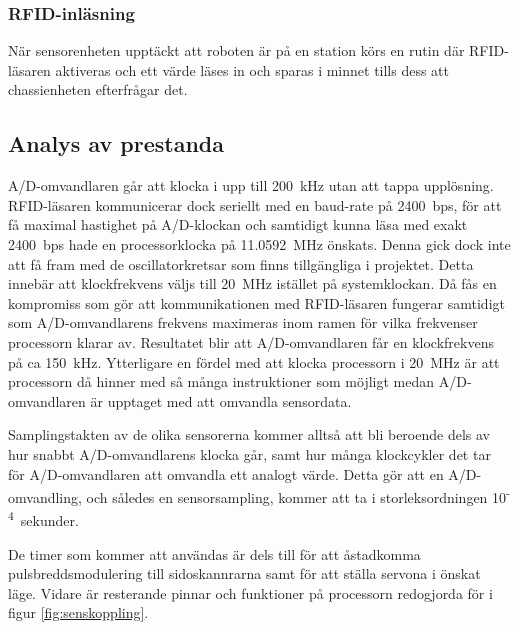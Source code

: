 \subsubsection{RFID-inläsning}

När sensorenheten upptäckt att roboten är på en station körs en rutin där RFID-läsaren aktiveras och ett värde läses in och sparas i minnet tills dess att chassienheten efterfrågar det.


\subsection{Analys av prestanda}

A/D-omvandlaren går att klocka i upp till 200~kHz utan att tappa upplösning. RFID-läsaren kommunicerar dock seriellt med en baud-rate på 2400~bps, för att få maximal hastighet på A/D-klockan och samtidigt kunna läsa med exakt 2400~bps hade en processorklocka på 11.0592~MHz önskats. Denna gick dock inte att få fram med de oscillatorkretsar som finns tillgängliga i projektet. Detta innebär att klockfrekvens väljs till  20~MHz istället på systemklockan. Då fås en kompromiss som gör att kommunikationen med RFID-läsaren fungerar samtidigt som A/D-omvandlarens frekvens maximeras inom ramen för vilka frekvenser processorn klarar av. Resultatet blir att A/D-omvandlaren får en klockfrekvens på ca 150~kHz. Ytterligare en fördel med att klocka processorn i 20~MHz är att processorn då hinner med så många instruktioner som möjligt medan A/D-omvandlaren är upptaget med att omvandla sensordata.

Samplingstakten av de olika sensorerna kommer alltså att bli beroende dels av hur snabbt A/D-omvandlarens klocka går, samt hur många klockcykler det tar för A/D-omvandlaren att omvandla ett analogt värde. Detta gör att en A/D-omvandling, och således en sensorsampling, kommer att ta i storleksordningen 10\textsuperscript{-4}~sekunder.

De timer som kommer att användas är dels till för att åstadkomma pulsbreddsmodulering till sidoskannrarna samt för att ställa servona i önskat läge. Vidare är resterande pinnar och funktioner på processorn redogjorda för i figur \ref{fig:senskoppling}.
